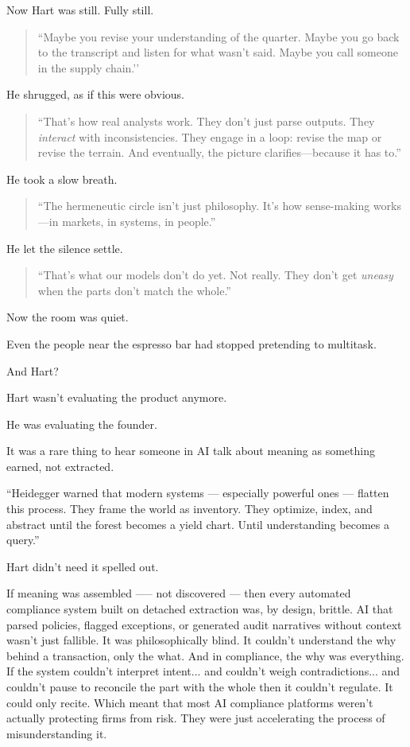 Now Hart was still. Fully still.

\begin{quote}
``Maybe you revise your understanding of the quarter.  
Maybe you go back to the transcript and listen for what wasn’t said.  
Maybe you call someone in the supply chain.’’
\end{quote}

He shrugged, as if this were obvious.

\begin{quote}
``That’s how real analysts work.  
They don’t just parse outputs. They \textit{interact} with inconsistencies.  
They engage in a loop: revise the map or revise the terrain.  
And eventually, the picture clarifies—because it has to.''
\end{quote}

He took a slow breath.

\begin{quote}
``The hermeneutic circle isn’t just philosophy.  
It’s how sense-making works—in markets, in systems, in people.''
\end{quote}

He let the silence settle.

\begin{quote}
``That’s what our models don’t do yet.  
Not really.  
They don’t get \textit{uneasy} when the parts don’t match the whole.''
\end{quote}

Now the room was quiet.

Even the people near the espresso bar had stopped pretending to multitask.

And Hart?

Hart wasn’t evaluating the product anymore.

He was evaluating the founder.






It was a rare thing to hear someone in AI talk about meaning as something earned, not extracted.

``Heidegger warned that modern systems 
--- especially powerful ones --- 
flatten this process.
They frame the world as inventory.
They optimize, index, and abstract until the forest becomes a yield chart.
Until understanding becomes a query.''

Hart didn’t need it spelled out.

If meaning was assembled —-- not discovered --- then every automated compliance system built on 
detached extraction was, by design, brittle. AI that parsed policies, flagged exceptions, or 
generated audit narratives without context wasn’t just fallible. It was philosophically blind. 
It couldn’t understand the why behind a transaction, only the what. 
And in compliance, the why was everything. 
If the system couldn’t interpret intent... 
and couldn’t weigh contradictions... 
and couldn’t pause to reconcile the part with the whole then it couldn’t regulate. 
It could only recite. 
Which meant that most AI compliance platforms weren’t actually protecting firms from risk. 
They were just accelerating the process of misunderstanding it.

